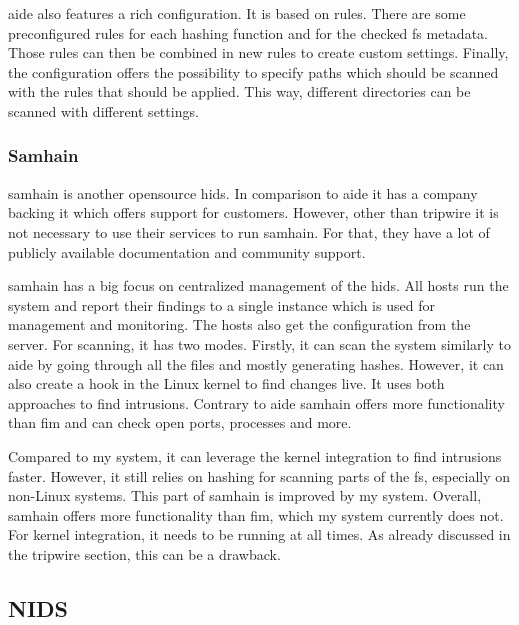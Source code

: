 \Gls{aide} also features a rich configuration. It is based on rules. There are some preconfigured rules for each hashing function and for the checked \gls{fs} \gls{metadata}. Those rules can then be combined in new rules to create custom settings. Finally, the configuration offers the possibility to specify paths which should be scanned with the rules that should be applied. This way, different directories can be scanned with different settings. \cite{aide:conf}

\subsubsection{Samhain}
\label{sec:samhain}

\Gls{samhain} is another \gls{opensource} \gls{hids}. In comparison to \gls{aide} it has a company backing it which offers support for customers. However, other than \gls{tripwire} it is not necessary to use their services to run \gls{samhain}. For that, they have a lot of publicly available documentation and community support. \cite{samhain:company}

\Gls{samhain} has a big focus on centralized management of the \gls{hids}. All hosts run the system and report their findings to a single instance which is used for management and monitoring. The hosts also get the configuration from the server. For scanning, it has two modes. Firstly, it can scan the system similarly to \gls{aide} by going through all the files and mostly generating hashes. However, it can also create a hook in the Linux kernel to find changes live. It uses both approaches to find \glspl{intrusion}. Contrary to \gls{aide} \gls{samhain} offers more functionality than \gls{fim} and can check open ports, processes and more. 

Compared to my system, it can leverage the kernel integration to find \glspl{intrusion} faster. However, it still relies on hashing for scanning parts of the \gls{fs}, especially on non-Linux systems. This part of \gls{samhain} is improved by my system. Overall, \gls{samhain} offers more functionality than \gls{fim}, which my system currently does not. For kernel integration, it needs to be running at all times. As already discussed in the tripwire section, this can be a drawback.

\subsection{NIDS}
\label{sec:def:nids}

